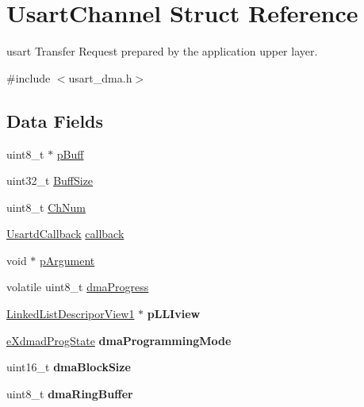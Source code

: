 \hypertarget{structUsartChannel}{}\section{Usart\+Channel Struct Reference}
\label{structUsartChannel}


usart Transfer Request prepared by the application upper layer.  




{\ttfamily \#include $<$usart\+\_\+dma.\+h$>$}

\subsection*{Data Fields}
\begin{DoxyCompactItemize}
\item 
uint8\+\_\+t $\ast$ \mbox{\hyperlink{structUsartChannel_a75bdea3ebe5a4b2ef19560a284b027f0}{p\+Buff}}
\item 
uint32\+\_\+t \mbox{\hyperlink{structUsartChannel_a15dff04dc63938048bc81783c82171d1}{Buff\+Size}}
\item 
uint8\+\_\+t \mbox{\hyperlink{structUsartChannel_a6b99be2ca3dc13a6aeb32ba1c1547146}{Ch\+Num}}
\item 
\mbox{\hyperlink{usart__dma_8h_a8a7d4dd5c8ed169acfb5acad786dcc43}{Usartd\+Callback}} \mbox{\hyperlink{structUsartChannel_a3d9d768214aa1e00871d9db20d130b2e}{callback}}
\item 
void $\ast$ \mbox{\hyperlink{structUsartChannel_abd278f7ec0073d5ab7317f3c3ffe7439}{p\+Argument}}
\item 
volatile uint8\+\_\+t \mbox{\hyperlink{structUsartChannel_aa3c51121c8e00da758ecca2bb9aaa39f}{dma\+Progress}}
\item 
\mbox{\label{structUsartChannel_ae826b596c37fdbc1bbd4de4beace2711}} 
\mbox{\hyperlink{group__dmad__structs_gad7875bda32a17423528ef3eea98e2be3}{Linked\+List\+Descripor\+View1}} $\ast$ {\bfseries p\+L\+L\+Iview}
\item 
\mbox{\label{structUsartChannel_a9ec5f8c812e7eec2046d4c34270f119a}} 
\mbox{\hyperlink{group__dmad__structs_gae5f8d9cd578ec745f050ebe575bc5753}{e\+Xdmad\+Prog\+State}} {\bfseries dma\+Programming\+Mode}
\item 
\mbox{\label{structUsartChannel_ab5afe30d096fc9e3a3caae7b59aef242}} 
uint16\+\_\+t {\bfseries dma\+Block\+Size}
\item 
\mbox{\label{structUsartChannel_a21e195b9aa79b1110e4e48a22f4de835}} 
uint8\+\_\+t {\bfseries dma\+Ring\+Buffer}
\end{DoxyCompactItemize}


